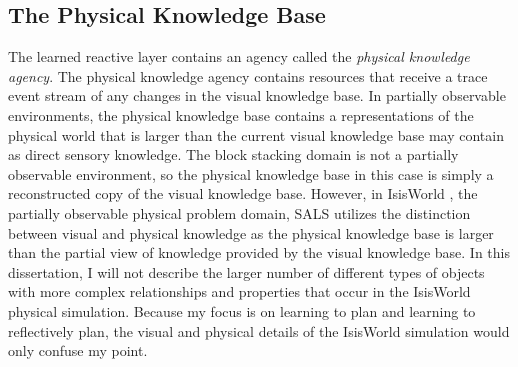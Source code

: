 \subsection{The Physical Knowledge Base}

The learned reactive layer contains an agency called the
{\emph{physical knowledge agency}}.  The physical knowledge agency
contains resources that receive a trace event stream of any changes in
the visual knowledge base.  In partially observable environments, the
physical knowledge base contains a representations of the physical
world that is larger than the current visual knowledge base may
contain as direct sensory knowledge.  The block stacking domain is not
a partially observable environment, so the physical knowledge base in
this case is simply a reconstructed copy of the visual knowledge base.
However, in IsisWorld {\cite[]{smith:2010}}, the partially observable
physical problem domain,
SALS utilizes the distinction between visual and physical knowledge as
the physical knowledge base is larger than the partial view of
knowledge provided by the visual knowledge base.  In this
dissertation, I will not describe the larger number of different types
of objects with more complex relationships and properties that occur
in the IsisWorld physical simulation.  Because my focus is on learning
to plan and learning to reflectively plan, the visual and physical
details of the IsisWorld simulation would only confuse my point.

